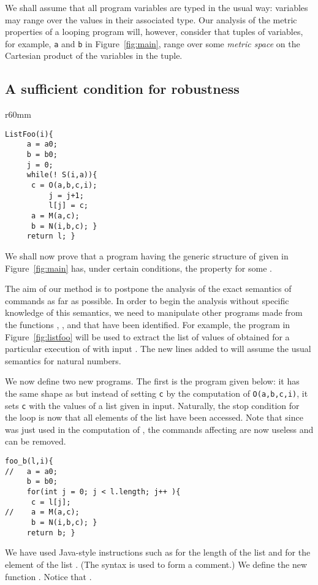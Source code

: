 \documentclass[copyright,creativecommons]{eptcs}
\begin{document}
We shall assume that all program variables are typed in the usual way:
variables may range over the values in their associated type.  Our
analysis of the metric properties of a looping program will, however,
consider that tuples of variables, for example, {\tt a} and {\tt b} in
Figure~\ref{fig:main}, range over some {\em metric space} on the
Cartesian product of the variables in the tuple.


\subsection{A sufficient condition for robustness}\label{sec:robustness}



\begin{wrapfigure}{r}{60mm}
\begin{lstlisting}[language=pscode]
ListFoo(i){
     a = a0;
     b = b0;
     j = 0;
     while(! S(i,a)){
	  c = O(a,b,c,i);
          j = j+1;
          l[j] = c;
	  a = M(a,c);
	  b = N(i,b,c); }
     return l; }
\end{lstlisting}
\caption{Collecting {\tt c} values in a list}\label{fig:listfoo}
\end{wrapfigure}

We shall now prove that a program having the generic structure of 
given in Figure~\ref{fig:main} has, under certain conditions, the
property  for some .

The aim of our method is to postpone the analysis of the exact
semantics of commands as far as possible. In order to begin the
analysis without specific knowledge of this semantics, we need to
manipulate other programs made from the functions , , and 
that have been identified.  For example, the program  in
Figure~\ref{fig:listfoo} will be used to extract the list of values
of  obtained for a particular execution of  with input .
The new lines added to  will assume the usual semantics for
natural numbers.







We now define two new programs.  The first is the 
 program given below: it has the same shape as 
but instead of setting {\tt c} by the computation of {\tt O(a,b,c,i)}, it
sets {\tt c} with the values of a list given in input. Naturally, the stop
condition for the loop is now that all elements of the list have been
accessed. Note that since  was just used in the computation of ,
the commands affecting  are now useless and can be removed. 
\begin{lstlisting}[language=pscode]
foo_b(l,i){
//   a = a0;
     b = b0;
     for(int j = 0; j < l.length; j++ ){
	  c = l[j];
//	  a = M(a,c);
	  b = N(i,b,c); }
     return b; }
\end{lstlisting}
We have used Java-style instructions such as  for the
length of the list  and  for the  element of the list
.  (The  syntax is used to form a comment.)  We define the new
function .  
Notice that . 
\end{document}
